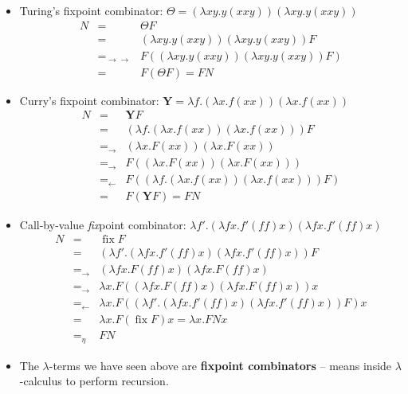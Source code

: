 \documentclass{beamer}
\newcommand{\tmem}[1]{{\em #1\/}}
\newcommand{\tmmathbf}[1]{\ensuremath{\boldsymbol{#1}}}
\newcommand{\tmop}[1]{\ensuremath{\operatorname{#1}}}
\newcommand{\tmstrong}[1]{\textbf{#1}}
\begin{document}
\begin{itemize}
  \item Turing's fixpoint combinator: $\Theta = (\lambda x y.y (x x y)) 
  (\lambda x y.y (x x y))$
  \begin{eqnarray*}
    N & = & \Theta F\\
    & = & (\lambda x y.y (x x y))  (\lambda x y.y (x x y)) F\\
    & =_{\rightarrow \rightarrow} & F ((\lambda x y.y (x x y))  (\lambda x
    y.y (x x y)) F)\\
    & = & F (\Theta F) = F N
  \end{eqnarray*}
  \item Curry's fixpoint combinator: $\tmmathbf{Y}= \lambda f. (\lambda x.f (x
  x))  (\lambda x.f (x x))$
  \begin{eqnarray*}
    N & = & \tmmathbf{Y}F\\
    & = & (\lambda f. (\lambda x.f (x x))  (\lambda x.f (x x))) F\\
    & =_{\rightarrow} & (\lambda x.F (x x))  (\lambda x.F (x x))\\
    & =_{\rightarrow} & F ((\lambda x.F (x x))  (\lambda x.F (x x)))\\
    & =_{\leftarrow} & F ((\lambda f. (\lambda x.f (x x))  (\lambda x.f (x
    x))) F)\\
    & = & F (\tmmathbf{Y}F) = F N
  \end{eqnarray*}
  \item Call-by-value {\tmem{fix}}point combinator: $\lambda f' . (\lambda f
  x.f'  (f f) x)  (\lambda f x.f'  (f f) x)$
  \begin{eqnarray*}
    N & = & \tmop{fix} F\\
    & = & (\lambda f' . (\lambda f x.f'  (f f) x)  (\lambda f x.f'  (f f) x))
    F\\
    & =_{\rightarrow} & (\lambda f x.F (f f) x)  (\lambda f x.F (f f) x)\\
    & =_{\rightarrow} & \lambda x.F ((\lambda f x.F (f f) x)  (\lambda f x.F
    (f f) x)) x\\
    & =_{\leftarrow} & \lambda x.F ((\lambda f' . (\lambda f x.f'  (f f) x) 
    (\lambda f x.f'  (f f) x)) F) x\\
    & = & \lambda x.F (\tmop{fix} F) x = \lambda x.F N x\\
    & =_{\eta} & F N
  \end{eqnarray*}
  \item The $\lambda$-terms we have seen above are {\tmstrong{fixpoint
  combinators}} -- means inside $\lambda$-calculus to perform recursion.
  

\end{itemize}
\end{document}
